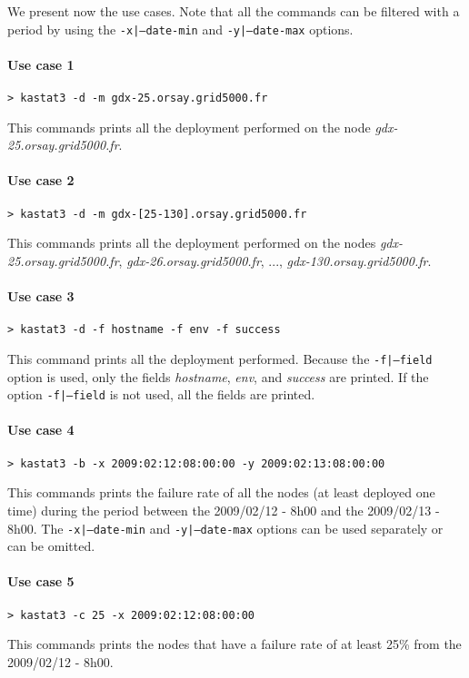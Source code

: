 \documentclass[a4wide,10pt,oneside]{book}
\begin{document}
We present now the use cases. Note that all the commands can be filtered with a period by using the \texttt{-x|--date-min} and \texttt{-y|--date-max} options.
\paragraph{Use case 1}
\begin{verbatim}
> kastat3 -d -m gdx-25.orsay.grid5000.fr
\end{verbatim}
This commands prints all the deployment performed on the node \textit{gdx-25.orsay.grid5000.fr}.

\paragraph{Use case 2}
\begin{verbatim}
> kastat3 -d -m gdx-[25-130].orsay.grid5000.fr
\end{verbatim}
This commands prints all the deployment performed on the nodes \textit{gdx-25.orsay.grid5000.fr}, \textit{gdx-26.orsay.grid5000.fr}, ..., \textit{gdx-130.orsay.grid5000.fr}.

\paragraph{Use case 3}
\begin{verbatim}
> kastat3 -d -f hostname -f env -f success
\end{verbatim}
This command prints all the deployment performed. Because the \texttt{-f|--field} option is used, only the fields \textit{hostname}, \textit{env}, and \textit{success} are printed. If the option \texttt{-f|--field} is not used, all the fields are printed.

\paragraph{Use case 4}
\begin{verbatim}
> kastat3 -b -x 2009:02:12:08:00:00 -y 2009:02:13:08:00:00
\end{verbatim}
This commands prints the failure rate of all the nodes (at least deployed one time) during the period between the 2009/02/12 - 8h00 and the 2009/02/13 - 8h00. The \texttt{-x|--date-min} and \texttt{-y|--date-max} options can be used separately or can be omitted.

\paragraph{Use case 5}
\begin{verbatim}
> kastat3 -c 25 -x 2009:02:12:08:00:00
\end{verbatim}
This commands prints the nodes that have a failure rate of at least 25\% from the 2009/02/12 - 8h00.
\end{document}
